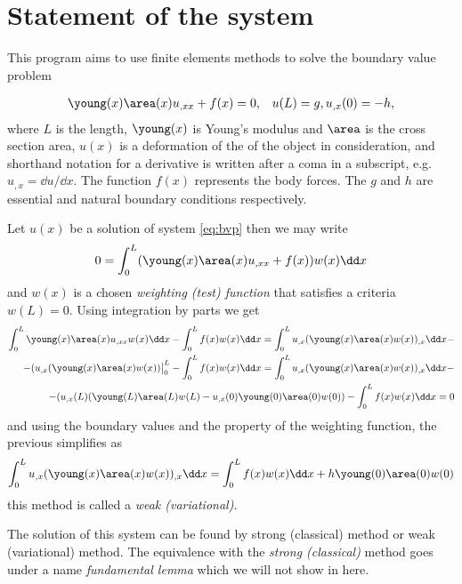 \documentclass[twoside,a4paper,12pt]{article}
\newcommand{\+}[2]{\newcommand#1{{\color{\notcolor}#2}}}
\newcommand{\1}[2]{\newcommand{#1}[1]{{\color{\notcolor}#2}}}
\newcommand{\2}[2]{\newcommand{#1}[2]{{\color{\notcolor}#2}}}
\begin{document}
\section{Statement of the system}

This program aims to use finite elements methods to solve the boundary
value problem

\begin{align}
  \young(x) \area(x) u_{,xx} + f(x) = 0, \label{eq:bvp}
  &&u(L) = g, u_{,x}(0) = -h,
\end{align}
where $L$ is the length, $\young(x)$ is Young's modulus and $\area$ is
the cross section area, $u(x)$ is a deformation of the of the object
in consideration, and shorthand notation for a derivative is written
after a coma in a subscript, e.g. $u_{,x} = \dd u /\dd x$.  The
function $f(x)$ represents the body forces. The $g$ and $h$ are
essential and natural boundary conditions respectively.

Let $u(x)$ be a solution of system \eqref{eq:bvp} then we may write
%
\begin{align}
  0 = \int_0^L (\young(x) \area(x) u_{,xx} + f(x)) w(x) \dd x 
\end{align}
and $w(x)$ is a chosen \emph{weighting (test) function} that satisfies a
criteria $w(L)=0$.
%
Using integration by parts we get
%
\begin{align}
  \int_0^L \young(x) \area(x) u_{,xx} w(x) \dd x 
  -\int_0^L f(x) w(x) \dd x  =
   \int_0^L u_{,x} (\young(x) \area(x) w(x))_{,x} \dd x -\nonumber \\ -
  (u_{,x} (\young(x) \area(x)  w(x))\big|_0^L -
  \int_0^L f(x) w(x) \dd x =  
  \int_0^L u_{,x} (\young(x) \area(x) w(x))_{,x} \dd x -\nonumber \\ -
  (u_{,x}(L) (\young(L) \area(L)  w(L) -
  u_{,x}(0) \young(0) \area(0)  w(0)) 
  -\int_0^L f(x) w(x) \dd x = 0
\end{align}
%
and using the boundary values and the property of the weighting
function, the previous simplifies as
%
\begin{align}
  \int_0^L u_{,x} (\young(x) \area(x) w(x))_{,x} \dd x =  
  \int_0^L f(x) w(x) \dd x + h \young(0) \area(0)  w(0)
  \label{eq:weak-exact}
\end{align}
%
this method is called a \emph{weak (variational)}.

The solution of this system can be found by strong (classical) method
or weak (variational) method. The equivalence with the \emph{strong
  (classical)} method goes under a name \emph{fundamental lemma} which we will not show in here.
\end{document}
